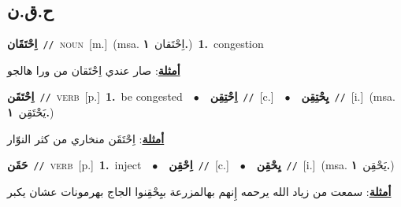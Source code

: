 \documentclass[10pt,a4paper,twoside]{article} %
\begin{document}
\begin{multicols}{2}
\vspace{-3mm}
\subsection*{\color{blue}\foreignlanguage{arabic}{ح.ق.ن}\color{blue}{}} 

{\setlength\topsep{0pt}\textbf{\foreignlanguage{arabic}{اِحْتَقَان}}\ {\color{gray}\texttt{//}\color{black}}\ \textsc{noun}\ [m.]\ \color{gray}(msa. \foreignlanguage{arabic}{اِحْتَقان}~\foreignlanguage{arabic}{\textbf{١.}})\color{black}\ \textbf{1.}~congestion\  \begin{flushright}\color{gray}\foreignlanguage{arabic}{\textbf{\underline{\foreignlanguage{arabic}{أمثلة}}}: صار عندي اِحْتَقان من ورا هالجو}\end{flushright}\color{black}} \vspace{2mm}

{\setlength\topsep{0pt}\textbf{\foreignlanguage{arabic}{اِحْتَقَن}}\ {\color{gray}\texttt{//}\color{black}}\ \textsc{verb}\ [p.]\ \textbf{1.}~be congested\ \ $\bullet$\ \ \setlength\topsep{0pt}\textbf{\foreignlanguage{arabic}{اِحْتِقِن}}\ {\color{gray}\texttt{//}\color{black}}\ [c.]\ \ $\bullet$\ \ \setlength\topsep{0pt}\textbf{\foreignlanguage{arabic}{يِحْتِقِن}}\ {\color{gray}\texttt{//}\color{black}}\ [i.]\ \color{gray}(msa. \foreignlanguage{arabic}{يَحْتَقِن}~\foreignlanguage{arabic}{\textbf{١.}})\color{black}\  \begin{flushright}\color{gray}\foreignlanguage{arabic}{\textbf{\underline{\foreignlanguage{arabic}{أمثلة}}}: اِحْتَقَن منخاري من كثر النوّار}\end{flushright}\color{black}} \vspace{2mm}

{\setlength\topsep{0pt}\textbf{\foreignlanguage{arabic}{حَقَن}}\ {\color{gray}\texttt{//}\color{black}}\ \textsc{verb}\ [p.]\ \textbf{1.}~inject\ \ $\bullet$\ \ \setlength\topsep{0pt}\textbf{\foreignlanguage{arabic}{اِحْقِن}}\ {\color{gray}\texttt{//}\color{black}}\ [c.]\ \ $\bullet$\ \ \setlength\topsep{0pt}\textbf{\foreignlanguage{arabic}{يِحْقِن}}\ {\color{gray}\texttt{//}\color{black}}\ [i.]\ \color{gray}(msa. \foreignlanguage{arabic}{يَحْقِن}~\foreignlanguage{arabic}{\textbf{١.}})\color{black}\  \begin{flushright}\color{gray}\foreignlanguage{arabic}{\textbf{\underline{\foreignlanguage{arabic}{أمثلة}}}: سمعت من زياد الله يرحمه إِنهم بهالمزرعة بيِحْقِنوا الجاج بهرمونات عشان يكبر}\end{flushright}\color{black}} \vspace{2mm}


\end{multicols}
\end{document}
